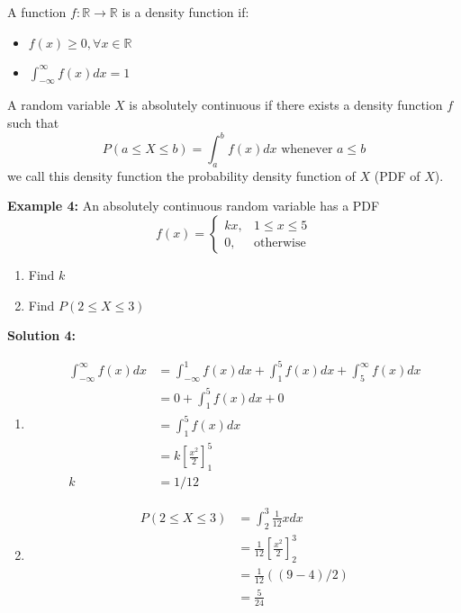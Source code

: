 \documentclass[12pt, twoside]{article}
\begin{document}
\begin{tcolorbox}[title=Definition: Density Function]
	A function $f:\mathbb{R} \longrightarrow \mathbb{R}$ is a density function if:
	\begin{itemize}
		\item{$f(x) \geq 0, \forall x \in\mathbb{R}$}
		\item{$\int_{-\infty}^{\infty} f(x) dx = 1$}
	\end{itemize}
\end{tcolorbox}

\begin{tcolorbox}[title=Definition: Absolutely Continuous Random Variables]
	A random variable $X$ is absolutely continuous if there exists a density function $f$ such that $$P(a \leq X \leq b ) = \int_{a}^{b} f(x) dx \text{ whenever } a \leq b$$
	we call this density function the probability density function of $X$ (PDF of $X$).
\end{tcolorbox}

\textbf{Example 4:} An absolutely continuous random variable has a PDF $$f(x) = \begin{cases}
	kx, & 1 \leq x \leq 5\\
	0, & \text{otherwise}
\end{cases}
$$
\begin{enumerate}
	\item{Find $k$}
	\item{Find $P(2 \leq X \leq 3)$}
\end{enumerate}

\textbf{Solution 4:}
\begin{enumerate}
	\item{
	\begin{align*}
		\int_{-\infty}^{\infty} f(x) dx &= \int_{-\infty}^{1} f(x) dx + \int_{1}^{5} f(x) dx + \int_{5}^{\infty} f(x) dx\\
		&= 0 + \int_{1}^{5} f(x) dx + 0\\
		&= \int_{1}^{5} f(x) dx\\
		&= k[\frac{x^2}{2}]^{5}_{1}\\
		k &= 1/12
	\end{align*}
	}
	\item{
	\begin{align*}
		P(2 \leq X \leq 3) &= \int_{2}^{3} \frac{1}{12}x dx\\
		&= \frac{1}{12}[\frac{x^2}{2}]^{3}_{2}\\
		&= \frac{1}{12}((9-4)/2)\\
		&= \frac{5}{24}
	\end{align*}
	}
\end{enumerate}
\end{document}
